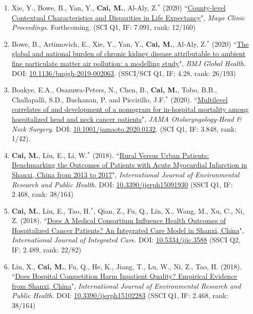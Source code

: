\documentclass[11pt, a4paper]{article}
\newcommand{\years}[1]{\marginnote{\scriptsize #1}}
\begin{document}
\begin{enumerate}[leftmargin=0ex,itemsep=1ex]
		\item Xie, Y., Bowe, B., Yan, Y., \textbf{Cai, M.}, Al-Aly, Z.$^\ast$ (2020) ``\ul{County-level Contextual Characteristics and Disparities in Life Expectancy}", \emph{Mayo Clinic Proceedings}. Forthcoming. (SCI Q1, IF: 7.091, rank: 12/160)
		
		\item Bowe, B., Artimovich, E., Xie, Y., Yan, Y., \textbf{Cai, M.}, Al-Aly, Z.$^\ast$ (2020) ``\ul{The global and national burden of chronic kidney disease attributable to ambient fine particulate matter air pollution: a modelling study}", \emph{BMJ Global Health}. DOI: \href{https://doi.org/10.1136/bmjgh-2019-002063}{10.1136/bmjgh-2019-002063}. (SSCI/SCI Q1, IF: 4.28, rank: 26/193)
		
		\item Boakye, E.A., Osazuwa-Peters, N., Chen, B., \textbf{Cai, M.}, Tobo, B.B., Challapalli, S.D., Buchanan, P. and Piccirillo, J.F.$^\ast$ (2020). ``\ul{Multilevel correlates of and development of a nomogram for in-hospital mortality among hospitalized head and neck cancer patients}", \emph{JAMA Otolaryngology-Head \& Neck Surgery}. DOI: \href{https://doi.org/10.1001/jamaoto.2020.0132}{10.1001/jamaoto.2020.0132}. (SCI Q1, IF: 3.848, rank: 1/42).
		
		
		
		\item \years{2018}\textcolor{RubineRed}{\textbf{Cai, M.}}, Liu, E., Li, W.$^\ast$ (2018). ``\ul{Rural Versus Urban Patients: Benchmarking the Outcomes of Patients with Acute Myocardial Infarction in Shanxi, China from 2013 to 2017}", \emph{International Journal of Environmental Research and Public Health}. DOI: \href{https://doi.org/10.3390/ijerph15091930}{10.3390/ijerph15091930} (SSCI Q1, IF: 2.468, rank: 38/164)
		
		\item \textcolor{RubineRed}{\textbf{Cai, M.}}, Liu, E., Tao, H.$^\ast$, Qian, Z., Fu, Q., Lin, X., Wang, M., Xu, C., Ni, Z. (2018). ``\ul{Does A Medical Consortium Influence Health Outcomes of Hospitalized Cancer Patients? An Integrated Care Model in Shanxi, China}", \emph{International Journal of Integrated Care}. DOI: \href{https://doi.org/10.5334/ijic.3588}{10.5334/ijic.3588} (SSCI Q2, IF: 2.489, rank: 22/82)
		
		\item Lin, X., \textbf{Cai, M.}, Fu, Q., He, K., Jiang, T., Lu, W., Ni, Z., Tao, H. (2018). ``\ul{Does Hospital Competition Harm Inpatient Quality? Empirical Evidence from Shanxi, China}", \emph{International Journal of Environmental Research and Public Health}. DOI: \href{https://doi.org/10.3390/ijerph15102283}{10.3390/ijerph15102283} (SSCI Q1, IF: 2.468, rank: 38/164)
		

\end{enumerate}
\end{document}
